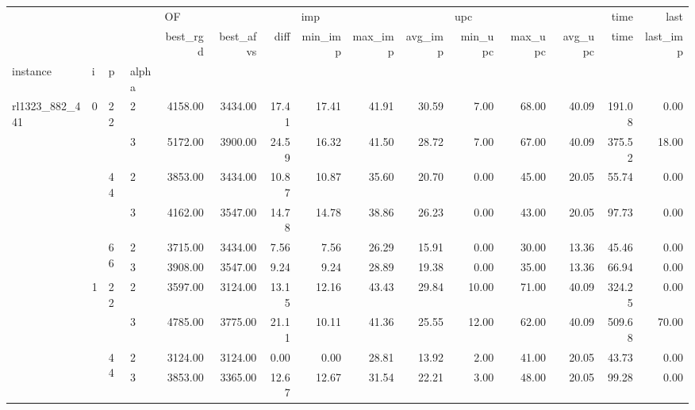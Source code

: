 \begin{tabular}{llllrrrrrrrrrrr}
\toprule
               &   &    &   & \multicolumn{3}{l}{OF} & \multicolumn{3}{l}{imp} & \multicolumn{3}{l}{upc} &    time &     last \\
               &   &    &   & best\_rgd & best\_afvs &  diff & min\_imp & max\_imp & avg\_imp & min\_upc & max\_upc & avg\_upc &    time & last\_imp \\
instance & i & p & alpha &          &           &       &         &         &         &         &         &         &         &          \\
\midrule
\multirow{60}{*}{rl1323\_882\_441} & \multirow{6}{*}{0} & \multirow{2}{*}{22} & 2 &  4158.00 &   3434.00 & 17.41 &   17.41 &   41.91 &   30.59 &    7.00 &   68.00 &   40.09 &  191.08 &     0.00 \\
               &   &    & 3 &  5172.00 &   3900.00 & 24.59 &   16.32 &   41.50 &   28.72 &    7.00 &   67.00 &   40.09 &  375.52 &    18.00 \\
\cline{3-15}
               &   & \multirow{2}{*}{44} & 2 &  3853.00 &   3434.00 & 10.87 &   10.87 &   35.60 &   20.70 &    0.00 &   45.00 &   20.05 &   55.74 &     0.00 \\
               &   &    & 3 &  4162.00 &   3547.00 & 14.78 &   14.78 &   38.86 &   26.23 &    0.00 &   43.00 &   20.05 &   97.73 &     0.00 \\
\cline{3-15}
               &   & \multirow{2}{*}{66} & 2 &  3715.00 &   3434.00 &  7.56 &    7.56 &   26.29 &   15.91 &    0.00 &   30.00 &   13.36 &   45.46 &     0.00 \\
               &   &    & 3 &  3908.00 &   3547.00 &  9.24 &    9.24 &   28.89 &   19.38 &    0.00 &   35.00 &   13.36 &   66.94 &     0.00 \\
\cline{2-15}
\cline{3-15}
               & \multirow{6}{*}{1} & \multirow{2}{*}{22} & 2 &  3597.00 &   3124.00 & 13.15 &   12.16 &   43.43 &   29.84 &   10.00 &   71.00 &   40.09 &  324.25 &     0.00 \\
               &   &    & 3 &  4785.00 &   3775.00 & 21.11 &   10.11 &   41.36 &   25.55 &   12.00 &   62.00 &   40.09 &  509.68 &    70.00 \\
\cline{3-15}
               &   & \multirow{2}{*}{44} & 2 &  3124.00 &   3124.00 &  0.00 &    0.00 &   28.81 &   13.92 &    2.00 &   41.00 &   20.05 &   43.73 &     0.00 \\
               &   &    & 3 &  3853.00 &   3365.00 & 12.67 &   12.67 &   31.54 &   22.21 &    3.00 &   48.00 &   20.05 &   99.28 &     0.00 \\

\end{tabular}

